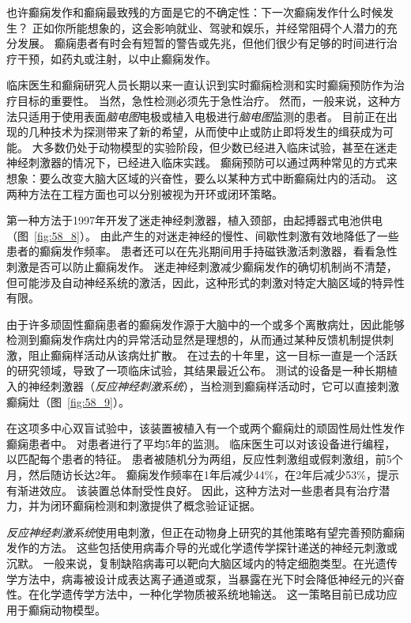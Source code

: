 \begin{proposition}[实时检测和预防癫痫的新方法] \label{box:58_2}
	
	\quad \quad 也许癫痫发作和癫痫最致残的方面是它的不确定性：下一次癫痫发作什么时候发生？
	正如你所能想象的，这会影响就业、驾驶和娱乐，并经常阻碍个人潜力的充分发展。
	癫痫患者有时会有短暂的警告或先兆，但他们很少有足够的时间进行治疗干预，如药丸或注射，以中止癫痫发作。
	
	\quad \quad 临床医生和癫痫研究人员长期以来一直认识到实时癫痫检测和实时癫痫预防作为治疗目标的重要性。
	当然，急性检测必须先于急性治疗。
	然而，一般来说，这种方法只适用于使用表面\textit{脑电图}电极或植入电极进行\textit{脑电图}监测的患者。
	目前正在出现的几种技术为探测带来了新的希望，从而使中止或防止即将发生的缉获成为可能。
	大多数仍处于动物模型的实验阶段，但少数已经进入临床试验，甚至在迷走神经刺激器的情况下，已经进入临床实践。
	癫痫预防可以通过两种常见的方式来想象：要么改变大脑大区域的兴奋性，要么以某种方式中断癫痫灶内的活动。
	这两种方法在工程方面也可以分别被视为开环或闭环策略。
	
	\quad \quad 第一种方法于1997年开发了迷走神经刺激器，植入颈部，由起搏器式电池供电（图~\ref{fig:58_8}）。
	由此产生的对迷走神经的慢性、间歇性刺激有效地降低了一些患者的癫痫发作频率。
	患者还可以在先兆期间用手持磁铁激活刺激器，看看急性刺激是否可以防止癫痫发作。
	迷走神经刺激减少癫痫发作的确切机制尚不清楚，但可能涉及自动神经系统的激活，因此，这种形式的刺激对特定大脑区域的特异性有限。
	
	\quad \quad 由于许多顽固性癫痫患者的癫痫发作源于大脑中的一个或多个离散病灶，因此能够检测到癫痫发作病灶内的异常活动显然是理想的，从而通过某种反馈机制提供刺激，阻止癫痫样活动从该病灶扩散。
	在过去的十年里，这一目标一直是一个活跃的研究领域，导致了一项临床试验，其结果最近公布。
	测试的设备是一种长期植入的神经刺激器（\textit{反应神经刺激系统}），当检测到癫痫样活动时，它可以直接刺激癫痫灶（图~\ref{fig:58_9}）。
	
	\quad \quad 在这项多中心双盲试验中，该装置被植入有一个或两个癫痫灶的顽固性局灶性发作癫痫患者中。
	对患者进行了平均5年的监测。
	临床医生可以对该设备进行编程，以匹配每个患者的特征。
	患者被随机分为两组，反应性刺激组或假刺激组，前5个月，然后随访长达2年。
	癫痫发作频率在1年后减少44\%，在2年后减少53\%，提示有渐进效应。
	该装置总体耐受性良好。
	因此，这种方法对一些患者具有治疗潜力，并为闭环癫痫检测和刺激提供了概念验证证据。
	
	\quad \quad \textit{反应神经刺激系统}使用电刺激，但正在动物身上研究的其他策略有望完善预防癫痫发作的方法。
	这些包括使用病毒介导的光或化学遗传学探针递送的神经元刺激或沉默。
	一般来说，复制缺陷病毒可以靶向大脑区域内的特定细胞类型。在光遗传学方法中，病毒被设计成表达离子通道或泵，当暴露在光下时会降低神经元的兴奋性。在化学遗传学方法中，一种化学物质被系统地输送。
	这一策略目前已成功应用于癫痫动物模型。
	

\end{proposition}
